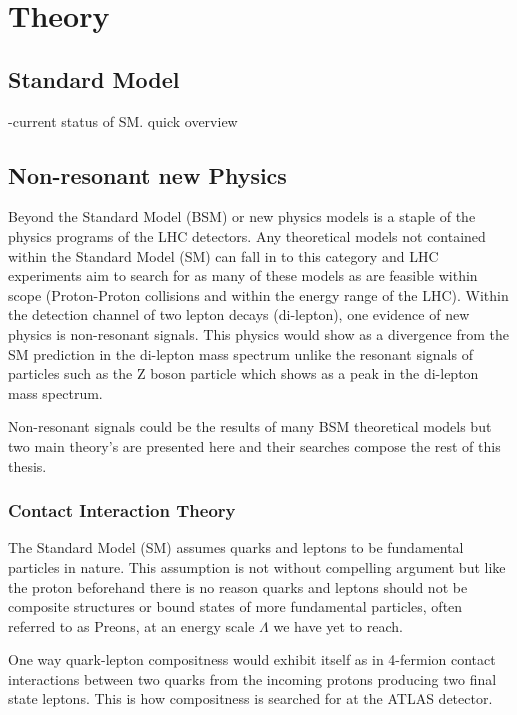 \chapter{Theory}


\section{Standard Model}
    
    -current status of SM. quick overview



\section{Non-resonant new Physics}

    Beyond the Standard Model (BSM) or new physics models is a staple of the physics programs of the LHC detectors. Any theoretical models not contained within the Standard Model (SM) can fall in to this category and LHC experiments aim to search for as many of these models as are feasible within scope (Proton-Proton collisions and within the energy range of the LHC). Within the detection channel of two lepton decays (di-lepton), one evidence of new physics is non-resonant signals. This physics would show as a divergence from the SM prediction in the di-lepton mass spectrum unlike the resonant signals of particles such as the Z boson particle which shows as a peak in the di-lepton mass spectrum.

    Non-resonant signals could be the results of many BSM theoretical models but two main theory’s are presented here and their searches compose the rest of this thesis.


    \subsection{Contact Interaction Theory}

        The Standard Model (SM) assumes quarks and leptons to be fundamental particles in nature. This assumption is not without compelling argument but like the proton beforehand there is no reason quarks and leptons should not be composite structures or bound states of more fundamental particles, often referred to as Preons\cite{new_tests}, at an energy scale $\Lambda$ we have yet to reach. 

        One way quark-lepton compositness would exhibit itself as in 4-fermion contact interactions between two quarks from the incoming protons producing two final state leptons. This is how compositness is searched for at the ATLAS detector.

